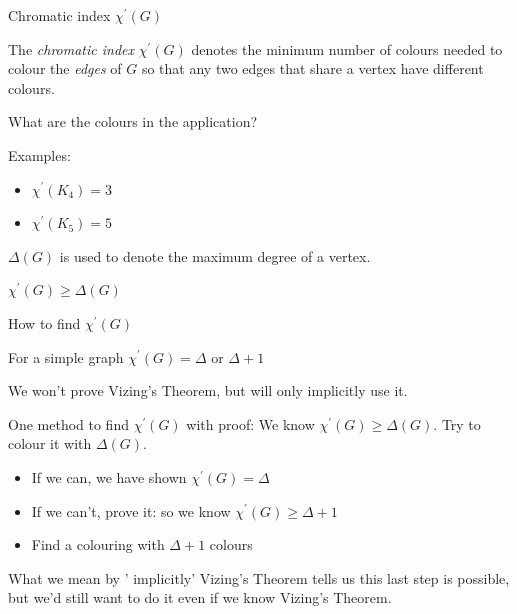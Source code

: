 \documentclass{beamer}
\begin{document}
\begin{frame}{Chromatic index $\chi^\prime(G)$}
  \begin{definition}
The \emph{chromatic index} $\chi^\prime(G)$ denotes the minimum number of colours needed to colour the \emph{edges} of $G$ so that any two edges that share a vertex have different colours.
    \end{definition}
  \begin{block}{What are the colours in the application?}
    \end{block}

\begin{block}{Examples:}
  \begin{itemize}
  \item $\chi^\prime(K_4)=3$
    \item $\chi^\prime(K_5)=5$
  \end{itemize}
\end{block}
$\Delta(G)$ is used to denote the maximum degree of a vertex.

\begin{lemma} $\chi^\prime(G)\geq \Delta(G)$
  \end{lemma}

\end{frame}

\begin{frame}{How to find $\chi^\prime(G)$}

  \begin{theorem}[Vizing]
For a simple graph $\chi^\prime(G)=\Delta$ or $\Delta+1$
    \end{theorem}
  We won't prove Vizing's Theorem, but will only implicitly use it.

  \begin{block}{One method to find $\chi^\prime(G)$ with proof:}
 We know $\chi^\prime(G)\geq \Delta(G)$.  Try to colour it with $\Delta(G)$.
 \begin{itemize}
 \item If we can, we have shown $\chi^\prime(G)=\Delta$
 \item If we can't, prove it: so we know $\chi^\prime(G)\geq \Delta+1$
 \item Find a colouring with $\Delta+1$ colours 
   \end{itemize}
\end{block}
\begin{block}{What we mean by ' implicitly'} 
Vizing's Theorem tells us this last step is possible, but we'd still want to do it even if we know Vizing's Theorem.


   \end{block}
  \end{frame}
\end{document}
